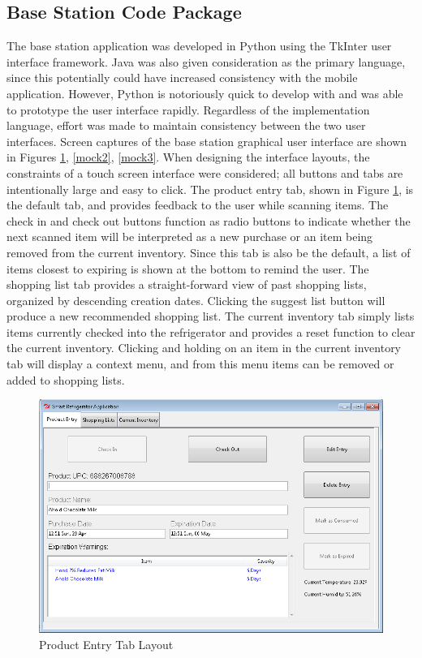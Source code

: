 \documentclass[11pt]{article} %
\begin{document}
\subsection{Base Station Code Package}
The base station application was developed in Python using the TkInter user interface framework. Java was also given consideration as the primary language, since this potentially could have increased consistency with the mobile application. However, Python is notoriously quick to develop with and was able to prototype the user interface rapidly. Regardless of the implementation language, effort was made to maintain consistency between the two user interfaces. Screen captures of the base station graphical user interface are shown in Figures \ref{mock1}, \ref{mock2}, \ref{mock3}. When designing the interface layouts, the constraints of a touch screen interface were considered; all buttons and tabs are intentionally large and easy to click. The product entry tab, shown in Figure \ref{mock1}, is the default tab, and provides feedback to the user while scanning items. The check in and check out buttons function as radio buttons to indicate whether the next scanned item will be interpreted as a new purchase or an item being removed from the current inventory. Since this tab is also be the default, a list of items closest to expiring is shown at the bottom to remind the user. The shopping list tab provides a straight-forward view of past shopping lists, organized by descending creation dates. Clicking the suggest list button will produce a new recommended shopping list. The current inventory tab simply lists items currently checked into the refrigerator and provides a reset function to clear the current inventory. Clicking and holding on an item in the current inventory tab will display a context menu, and from this menu items can be removed or added to shopping lists.
\pagebreak
\begin{figure}[h!]
\vspace{0.5cm}
\begin{center}
\includegraphics[scale=0.45]{../graphics/ProductEntry}
\caption{Product Entry Tab Layout}
\label{mock1}
\end{center}
\end{figure}
\end{document}
